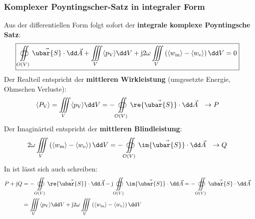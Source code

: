   \subsubsection{Komplexer Poyntingscher-Satz in integraler Form}
		   Aus der differentiellen Form folgt sofort der \textbf{integrale komplexe Poyntingsche Satz}:
			        \begin{equation}\label{komplpoyntint}
				       \boxed{ \oiint\limits_{O(V)} \vec{\ubar{S}}\cdot \dd\vec{A} + \iiint\limits_V \langle p_\text{V} \rangle \dd V + \mathrm{j}2\omega\iiint\limits_V \left( \langle w_\text{m}\rangle - \langle w_\text{e}\rangle \right)\dd V = 0}
			        \end{equation}
			  Der Realteil entspricht der \textbf{mittleren Wirkleistung} (umgesetzte Energie, Ohmschen Verluste):
			        \begin{equation}\begin{split}
					        \langle P_\text{V} \rangle = \iiint\limits_V \langle p_\text{V} \rangle \dd V = -\oiint\limits_{O(V)} \re{\vec{\ubar{S}}}\cdot \dd\vec{A}\quad \color{blue}{\to P}
				        \end{split}\end{equation}
			 Der Imaginärteil entspricht der \textbf{mittleren Blindleistung}:
			        \begin{equation}\begin{split}
					        2\omega\iiint\limits_V \left( \langle w_\text{m}\rangle - \langle w_\text{e}\rangle \right)\dd V = -\oiint\limits_{O(V)} \im{\vec{\ubar{S}}}\cdot \dd\vec{A}\quad\color{blue}{\to Q} 
				        \end{split}\end{equation}
			 In {\color{blue}{DNW-Notation}} ist lässt sich auch schreiben:
			 \begin{equation}\begin{split}
			 	\color{blue}P+\mathrm{j}Q&=-\oiint\limits_{O(V)} \re{\vec{\ubar{S}}}\cdot \dd\vec{A}-\mathrm{j}\oiint\limits_{O(V)} \im{\vec{\ubar{S}}}\cdot \dd\vec{A}=-\oiint\limits_{O(V)} \vec{\ubar{S}}\cdot \dd\vec{A}\\
			 		&=\iiint\limits_V \langle p_\text{V} \rangle \dd V + \mathrm{j}2\omega\iiint\limits_V \left( \langle w_\text{m}\rangle - \langle w_\text{e}\rangle \right)\dd V
			 \end{split}\end{equation}
